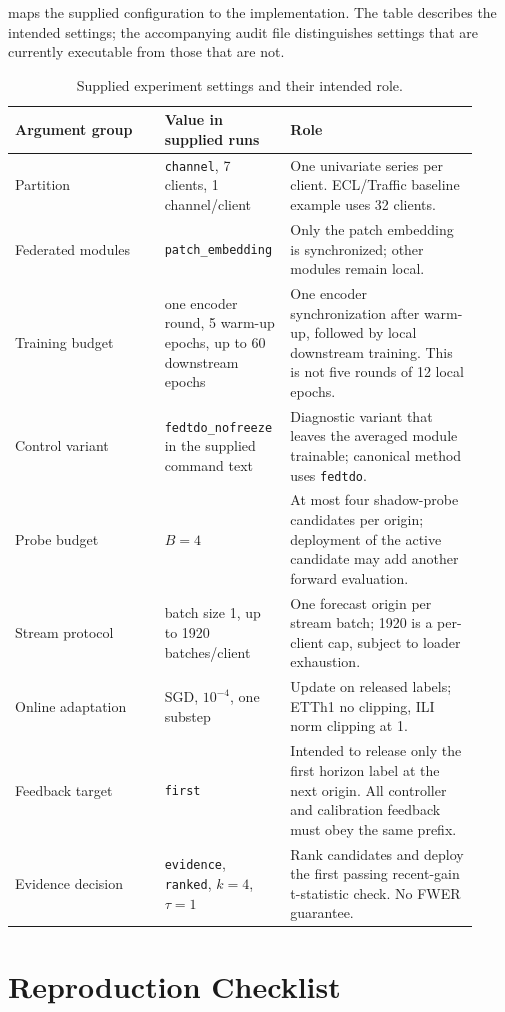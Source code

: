 \documentclass{article}
\theoremstyle{definition}
\begin{document}
 maps the supplied configuration to the implementation. The table describes the intended settings; the accompanying audit file distinguishes settings that are currently executable from those that are not.

\begin{table}[t]
\caption{Supplied experiment settings and their intended role.}
\label{tab:config}
\centering
\small
\begin{tabular}{p{0.31\linewidth}p{0.22\linewidth}p{0.39\linewidth}}
\toprule
Argument group & Value in supplied runs & Role\\
\midrule
Partition & \texttt{channel}, 7 clients, 1 channel/client & One univariate series per client. ECL/Traffic baseline example uses 32 clients.\\
Federated modules & \texttt{patch\_embedding} & Only the patch embedding is synchronized; other modules remain local.\\
Training budget & one encoder round, 5 warm-up epochs, up to 60 downstream epochs & One encoder synchronization after warm-up, followed by local downstream training. This is not five rounds of 12 local epochs.\\
Control variant & \texttt{fedtdo\_nofreeze} in the supplied command text & Diagnostic variant that leaves the averaged module trainable; canonical method uses \texttt{fedtdo}.\\
Probe budget & \(B=4\) & At most four shadow-probe candidates per origin; deployment of the active candidate may add another forward evaluation.\\
Stream protocol & batch size 1, up to 1920 batches/client & One forecast origin per stream batch; 1920 is a per-client cap, subject to loader exhaustion.\\
Online adaptation & SGD, \(10^{-4}\), one substep & Update on released labels; ETTh1 no clipping, ILI norm clipping at 1.\\
Feedback target & \texttt{first} & Intended to release only the first horizon label at the next origin. All controller and calibration feedback must obey the same prefix.\\
Evidence decision & \texttt{evidence}, \texttt{ranked}, \(k=4\), \(\tau=1\) & Rank candidates and deploy the first passing recent-gain t-statistic check. No FWER guarantee.\\
\bottomrule
\end{tabular}
\end{table}

\section{Reproduction Checklist}
\end{document}
